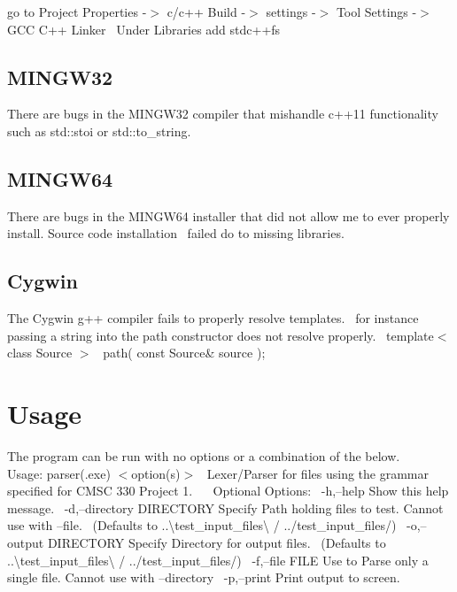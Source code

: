 go to Project Properties -\/$>$ c/c++ Build -\/$>$ settings -\/$>$ Tool Settings -\/$>$ G\+CC C++ Linker~\newline
Under Libraries add stdc++fs\hypertarget{index_MINGW32}{}\subsection{M\+I\+N\+G\+W32}\label{index_MINGW32}
There are bugs in the M\+I\+N\+G\+W32 compiler that mishandle c++11 functionality such as std\+::stoi or std\+::to\+\_\+string. \hypertarget{index_MINGW64}{}\subsection{M\+I\+N\+G\+W64}\label{index_MINGW64}
There are bugs in the M\+I\+N\+G\+W64 installer that did not allow me to ever properly install. Source code installation~\newline
failed do to missing libraries.~\newline
\hypertarget{index_Cygwin}{}\subsection{Cygwin}\label{index_Cygwin}
The Cygwin g++ compiler fails to properly resolve templates.~\newline
for instance passing a string into the path constructor does not resolve properly.~\newline
template$<$ class Source $>$~\newline
path( const Source\& source );~\newline
\hypertarget{index_Usage}{}\section{Usage}\label{index_Usage}
The program can be run with no options or a combination of the below.~\newline
~\newline
 Usage\+: parser(.exe) $<$option(s)$>$~\newline
 Lexer/\+Parser for files using the grammar specified for C\+M\+SC 330 Project 1.~\newline
~\newline
 Optional Options\+:~\newline
 -\/h,--help Show this help message.~\newline
 -\/d,--directory D\+I\+R\+E\+C\+T\+O\+RY Specify Path holding files to test. Cannot use with --file.~\newline
 (Defaults to ..\textbackslash{}test\+\_\+input\+\_\+files\textbackslash{} / ../test\+\_\+input\+\_\+files/)~\newline
 -\/o,--output D\+I\+R\+E\+C\+T\+O\+RY Specify Directory for output files.~\newline
 (Defaults to ..\textbackslash{}test\+\_\+input\+\_\+files\textbackslash{} / ../test\+\_\+input\+\_\+files/)~\newline
 -\/f,--file F\+I\+LE Use to Parse only a single file. Cannot use with --directory~\newline
 -\/p,--print Print output to screen.~\newline
